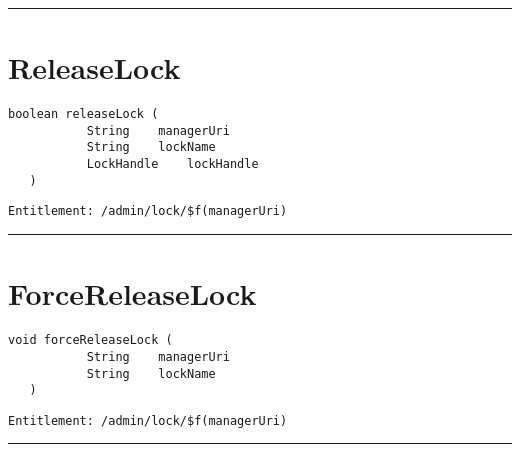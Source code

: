 \rule{12cm}{2pt}
\section{ReleaseLock}
\label{Api:ReleaseLock}
\begin{lstlisting}[style=nonumbers]
   boolean releaseLock (
           String    managerUri
           String    lockName
           LockHandle    lockHandle
   )
\end{lstlisting}
\begin{Verbatim}[formatcom=\color{Maroon}]
  Entitlement: /admin/lock/$f(managerUri)
\end{Verbatim}



\rule{12cm}{2pt}
\section{ForceReleaseLock}
\label{Api:ForceReleaseLock}
\begin{lstlisting}[style=nonumbers]
   void forceReleaseLock (
           String    managerUri
           String    lockName
   )
\end{lstlisting}
\begin{Verbatim}[formatcom=\color{Maroon}]
  Entitlement: /admin/lock/$f(managerUri)
\end{Verbatim}



\rule{12cm}{2pt}
